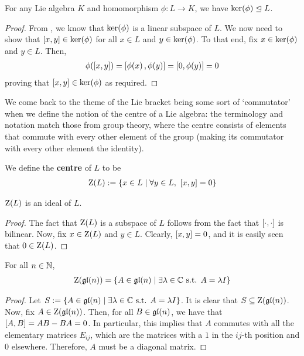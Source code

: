 \begin{lemma}
    For any Lie algebra $K$ and homomorphism $\phi : L \to K$, we have $\operatorname{ker}\!\left( \phi \right) \trianglelefteq L$.
\end{lemma}
\begin{proof}
    From , we know that $\operatorname{ker}\!\left( \phi \right)$ is a linear subspace of $L$. We now need to show that $\left[ x, y \right] \in \operatorname{ker}\!\left( \phi \right)$ for all $x \in L$ and $y \in \operatorname{ker}\!\left( \phi \right)$. To that end, fix $x \in \operatorname{ker}\!\left( \phi \right)$ and $y \in L$. Then,
    \begin{align*}
        \phi\!\left( \left[ x, y \right] \right) = \left[ \phi\!\left( x \right), \phi\!\left( y \right) \right] = \left[ 0, \phi\!\left( y \right) \right] = 0
    \end{align*}
    proving that $\left[ x, y \right] \in \operatorname{ker}\!\left( \phi \right)$ as required.
\end{proof}

We come back to the theme of the Lie bracket being some sort of `commutator' when we define the notion of the centre of a Lie algebra: the terminology and notation match those from group theory, where the centre consists of elements that commute with every other element of the group (making its commutator with every other element the identity).

\begin{boxdefinition}
    We define the \textbf{centre} of $L$ to be
    \begin{align*}
        \operatorname{Z}\!\left( L \right) := \left\{ x \in L \; \middle\vert \; \forall y \in L, \ \left[ x, y \right] = 0 \right\}
    \end{align*}
\end{boxdefinition}

\begin{lemma}
    $\operatorname{Z}\!\left( L \right)$ is an ideal of $L$.
\end{lemma}
\begin{proof}
    The fact that $\operatorname{Z}\!\left( L \right)$ is a subspace of $L$ follows from the fact that $\left[ \cdot, \cdot \right]$ is bilinear. Now, fix $x \in \operatorname{Z}\!\left( L \right)$ and $y \in L$. Clearly, $\left[ x, y \right] = 0$, and it is easily seen that $0 \in \operatorname{Z}\!\left( L \right)$.
\end{proof}

\begin{boxexample}
    For all $n \in \mathbb{N}$,
    \begin{align*}
        \operatorname{Z}\!\left( \mathfrak{gl}\!\left( n \right) \right) = \left\{ A \in \mathfrak{gl}\!\left( n \right) \; \middle\vert \; \exists \lambda \in \mathbb{C} \text{ s.t. } A = \lambda I \right\}
    \end{align*}
    \begin{proof}
        Let $S := \left\{ A \in \mathfrak{gl}\!\left( n \right) \; \middle\vert \; \exists \lambda \in \mathbb{C} \text{ s.t. } A = \lambda I \right\}$. It is clear that $S \subseteq \operatorname{Z}\!\left( \mathfrak{gl}\!\left( n \right) \right)$. Now, fix $A \in \operatorname{Z}\!\left( \mathfrak{gl}\!\left( n \right) \right)$. Then, for all $B \in \mathfrak{gl}\!\left( n \right)$, we have that $\left[ A, B \right] = AB - BA = 0$. In particular, this implies that $A$ commutes with all the elementary matrices $E_{ij}$, which are the matrices with a $1$ in the $ij$-th position and $0$ elsewhere. Therefore, $A$ must be a diagonal matrix. 
    \end{proof}
\end{boxexample}

